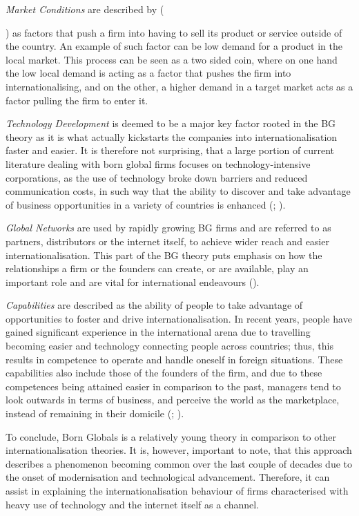 \documentclass[11pt,a4paper]{article}
\begin{document}
{\textit{Market Conditions} are described by \citeauthor{madsenInternationalizationBornGlobals1997} ({\citeyear{madsenInternationalizationBornGlobals1997}) as factors that push a firm into having to sell its product or service outside of the country. An example of such factor can be low demand for a product in the local market. This process can be seen as a two sided coin, where on one hand the low local demand is acting as a factor that pushes the firm into internationalising, and on the other, a higher demand in a target market acts as a factor pulling the firm to enter it. \par
\textit{Technology Development} is deemed to be a major key factor rooted in the BG theory as it is what actually kickstarts the companies into internationalisation faster and easier. It is therefore not surprising, that a large portion of current literature dealing with born global firms focuses on technology-intensive corporations, as the use of technology broke down barriers and reduced communication costs, in such way that the ability to discover and take advantage of business opportunities in a variety of countries is enhanced (\cite{oviattTheoryInternationalNew1994}; \cite{knightInternationalizationIncrementalBorn2016}). \par
\textit{Global Networks} are used by rapidly growing BG firms and are referred to as partners, distributors or the internet itself, to achieve wider reach and easier internationalisation. This part of the BG theory puts emphasis on how the relationships a firm or the founders can create, or are available, play an important role and are vital for international endeavours (\cite{fletcherInternationalEntrepreneurshipBorn2011}). \par
\textit{Capabilities} are described as the ability of people to take advantage of opportunities to foster and drive internationalisation. In recent years, people have gained significant experience in the international arena due to travelling becoming easier and technology connecting people across countries; thus, this results in competence to operate and handle oneself in foreign situations. These capabilities also include those of the founders of the firm, and due to these competences being attained easier in comparison to the past, managers tend to look outwards in terms of business, and perceive the world as the marketplace, instead of remaining in their domicile (\cite{madsenInternationalizationBornGlobals1997}; \cite{rialpBornglobalPhenomenonComparative2005}). \par
To conclude, Born Globals is a relatively young theory in comparison to other internationalisation theories. It is, however, important to note, that this approach describes a phenomenon becoming common over the last couple of decades due to the onset of modernisation and technological advancement. Therefore, it can assist in explaining the internationalisation behaviour of firms characterised with heavy use of technology and the internet itself as a channel.  

}}
\end{document}
